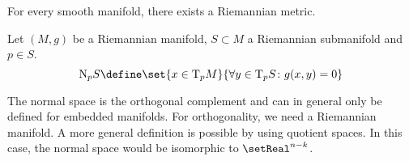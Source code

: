 \documentclass{stdlocal}
\begin{document}
\begin{theorem}
  For every smooth manifold, there exists a Riemannian metric.
\end{theorem}

\begin{definition}
  Let $(M,g)$ be a Riemannian manifold, $S\subset M$ a Riemannian submanifold and $p\in S$.
  \[
    \mathrm{N}_pS \define \set{x\in \mathrm{T}_pM}{\forall y\in\mathrm{T}_pS\colon g(x,y)=0}
  \]
\end{definition}
The normal space is the orthogonal complement and can in general only be defined for embedded manifolds.
For orthogonality, we need a Riemannian manifold.
A more general definition is possible by using quotient spaces.
In this case, the normal space would be isomorphic to $\setReal^{n-k}$.

\end{document}

